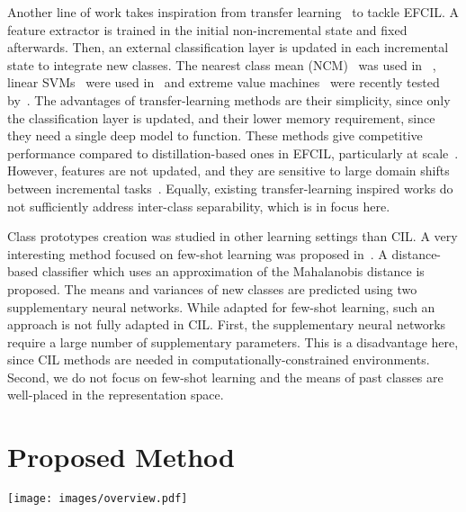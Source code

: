 \documentclass[10pt,twocolumn,letterpaper]{article}
\makeatletter
\newcommand{\ourmodel}{FeTrIL\@\xspace}
\makeatother
\begin{document}
Another line of work takes inspiration from transfer learning~\cite{neyshabur2020being,sharif2014cnn} to tackle EFCIL.
A feature extractor is trained in the initial non-incremental state and fixed afterwards. 
Then, an external classification layer is updated in each incremental state to integrate new classes. 
The nearest class mean (NCM)~\cite{mensink2013distance} was used in ~\cite{rebuffi2017_icarl}, linear SVMs~\cite{fabian2012_scikitlearn} were used in~\cite{belouadah2018_deesil} and extreme value machines~\cite{rudd2017extreme} were recently tested by~\cite{dhamija2021self}. 
The advantages of transfer-learning methods are their simplicity, since only the classification layer is updated, and their lower memory requirement, since they need a single deep model to function.
These methods give competitive performance compared to distillation-based ones in EFCIL, particularly at scale~\cite{belouadah2021_study}.
However, features are not updated, and they are sensitive to large domain shifts between incremental tasks~\cite{lange2019}. 
Equally, existing transfer-learning inspired works do not sufficiently address inter-class separability, which is in focus here. 


Class prototypes creation was studied in other learning settings than CIL.
A very interesting method focused on few-shot learning was proposed in~\cite{das2019two}. 
A distance-based classifier which uses an approximation of the Mahalanobis distance is proposed.
The means and variances of new classes are predicted using two supplementary neural networks. 
While adapted for few-shot learning, such an approach is not fully adapted in CIL.
First, the supplementary neural networks require a large number of supplementary parameters. 
This is a disadvantage here, since CIL methods are needed in computationally-constrained environments. 
Second, we do not focus on few-shot learning and the means of past classes are well-placed in the representation space. 

\section{Proposed Method}
\label{sec:method}

\begin{figure*}[t]
	\centering
\texttt{[image: images/overview.pdf]} \caption{\ourmodel overview for a toy example with an initial state (3 classes) and two incremental states (1 class per state). The feature extractor $\mathcal{F}$ is trained in the initial state, using sets of data $X_1, X_2, X_3$, and then frozen afterwards. The generator $\mathcal{G}$ uses features $f(C_n)$ of the new class extracted with $\mathcal{F}$ and prototypes of past classes $\mu(C_p)$ to generate pseudo-features of past classes $\hat{f^t}(C_p)$ in the $t^{th}$ state. Prototypes ($\mu(C_i)$) are the centroids of all classes (past and new). They are learned when classes are first seen and then stored throughout the IL process. A linear classifier $\mathcal{L}$ is used to learn classification weights $w(C_i)$ for all seen classes (past and new).   
	}
	\vspace{-4mm}
	\label{fig:overview}
\end{figure*}
\end{document}
